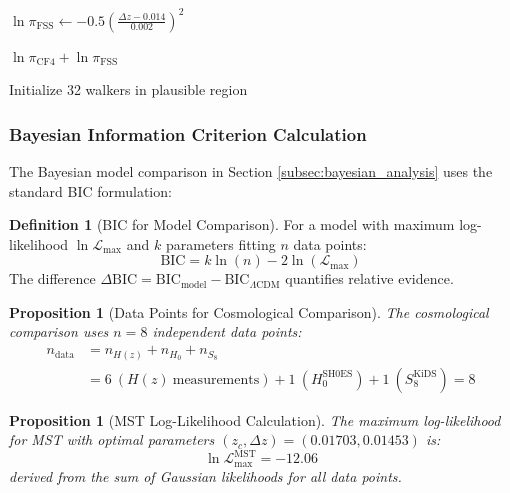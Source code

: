 \documentclass[11pt, a4paper]{article}
\theoremstyle{plain}
\newtheorem{proposition}[theorem]{Proposition}
\theoremstyle{definition}
\newtheorem{definition}[theorem]{Definition}
\begin{document}
\begin{algorithm}[htbp]
{    
    $\ln\pi_{\text{FSS}} \gets -0.5\left(\frac{\Delta z - 0.014}{0.002}\right)^2$\;
    
    \Return $\ln\pi_{\text{CF4}} + \ln\pi_{\text{FSS}}$\;
}


Initialize 32 walkers in plausible region\;
\caption{Bayesian inference for MST parameters}
\label{alg:bayesian_inference}
\end{algorithm}

\subsubsection{Bayesian Information Criterion Calculation}

The Bayesian model comparison in Section \ref{subsec:bayesian_analysis} uses the standard BIC formulation:

\begin{definition}[BIC for Model Comparison]
For a model with maximum log-likelihood $\ln\mathcal{L}_{\text{max}}$ and $k$ parameters fitting $n$ data points:
\begin{equation}
\text{BIC} = k \ln(n) - 2 \ln(\mathcal{L}_{\text{max}})
\end{equation}
The difference $\Delta\text{BIC} = \text{BIC}_{\text{model}} - \text{BIC}_{\Lambda\text{CDM}}$ quantifies relative evidence.
\end{definition}

\begin{proposition}[Data Points for Cosmological Comparison]
The cosmological comparison uses $n = 8$ independent data points:
\begin{align}
n_{\text{data}} &= n_{H(z)} + n_{H_0} + n_{S_8} \\
&= 6\ (H(z)\ \text{measurements}) + 1\ (H_0^{\text{SH0ES}}) + 1\ (S_8^{\text{KiDS}}) = 8
\end{align}
\end{proposition}

\begin{proposition}[MST Log-Likelihood Calculation]
The maximum log-likelihood for MST with optimal parameters $(z_c, \Delta z) = (0.01703, 0.01453)$ is:
\begin{equation}
\ln\mathcal{L}_{\text{max}}^{\text{MST}} = -12.06
\end{equation}
derived from the sum of Gaussian likelihoods for all data points.
\end{proposition}
\end{document}
